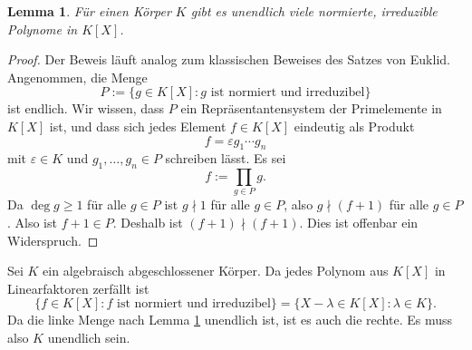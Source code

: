 \documentclass[a4paper,10pt]{article}
\newcounter{satze}
\newtheorem{lem}[satze]{Lemma}
\theoremstyle{definition}
\begin{document}
\begin{lem}\label{lem: unendlich viele irreduzible Polynome}
 Für einen Körper $K$ gibt es unendlich viele normierte, irreduzible Polynome in $K[X]$.
\end{lem}
\begin{proof}
 Der Beweis läuft analog zum klassischen Beweises des Satzes von Euklid. Angenommen, die Menge
 \[
  P := \{g \in K[X] : g \text{ ist normiert und irreduzibel}\}
 \]
 ist endlich. Wir wissen, dass $P$ ein Repräsentantensystem der Primelemente in $K[X]$ ist, und dass sich jedes Element $f \in K[X]$ eindeutig als Produkt
 \[
  f = \varepsilon g_1 \cdots g_n
 \]
 mit $\varepsilon \in K$ und $g_1, \ldots, g_n \in P$ schreiben lässt. Es sei
 \[
  f := \prod_{g \in P} g.
 \]
 Da $\deg g \geq 1$ für alle $g \in P$ ist $g \nmid 1$ für alle $g \in P$, also $g \nmid (f+1)$ für alle $g \in P$. Also ist $f+1 \in P$. Deshalb ist $(f+1) \nmid (f+1)$. Dies ist offenbar ein Widerspruch.
\end{proof}

Sei $K$ ein algebraisch abgeschlossener Körper. Da jedes Polynom aus $K[X]$ in Linearfaktoren zerfällt ist
\[
 \{f \in K[X] : f \text{ ist normiert und irreduzibel}\} = \{X-\lambda \in K[X] : \lambda \in K\}.
\]
Da die linke Menge nach Lemma \ref{lem: unendlich viele irreduzible Polynome} unendlich ist, ist es auch die rechte. Es muss also $K$ unendlich sein.
\end{document}
